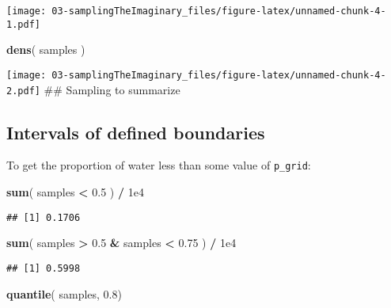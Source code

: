 \documentclass[
]{book}
\newenvironment{Shaded}{\begin{snugshade}}{\end{snugshade}}
\newcommand{\FloatTok}[1]{\textcolor[rgb]{0.00,0.00,0.81}{#1}}
\newcommand{\KeywordTok}[1]{\textcolor[rgb]{0.13,0.29,0.53}{\textbf{#1}}}
\newcommand{\NormalTok}[1]{#1}
\newcommand{\OperatorTok}[1]{\textcolor[rgb]{0.81,0.36,0.00}{\textbf{#1}}}
\newcommand{\StringTok}[1]{\textcolor[rgb]{0.31,0.60,0.02}{#1}}
\begin{document}
\texttt{[image: 03-samplingTheImaginary\_files/figure-latex/unnamed-chunk-4-1.pdf]}

\begin{Shaded}
\begin{Highlighting}[]
\KeywordTok{dens}\NormalTok{( samples )}
\end{Highlighting}
\end{Shaded}

\texttt{[image: 03-samplingTheImaginary\_files/figure-latex/unnamed-chunk-4-2.pdf]}
\#\# Sampling to summarize

\hypertarget{intervals-of-defined-boundaries}{%
\subsection{Intervals of defined boundaries}\label{intervals-of-defined-boundaries}}

To get the proportion of water less than some value of \texttt{p\_grid}:

\begin{Shaded}
\begin{Highlighting}[]
\KeywordTok{sum}\NormalTok{( samples }\OperatorTok{<}\StringTok{ }\FloatTok{0.5}\NormalTok{ ) }\OperatorTok{/}\StringTok{ }\FloatTok{1e4}
\end{Highlighting}
\end{Shaded}

\begin{verbatim}
## [1] 0.1706
\end{verbatim}

\begin{Shaded}
\begin{Highlighting}[]
\KeywordTok{sum}\NormalTok{( samples }\OperatorTok{>}\StringTok{ }\FloatTok{0.5} \OperatorTok{&}\StringTok{ }\NormalTok{samples }\OperatorTok{<}\StringTok{ }\FloatTok{0.75}\NormalTok{ ) }\OperatorTok{/}\StringTok{ }\FloatTok{1e4}
\end{Highlighting}
\end{Shaded}

\begin{verbatim}
## [1] 0.5998
\end{verbatim}

\begin{Shaded}
\begin{Highlighting}[]
\KeywordTok{quantile}\NormalTok{( samples, }\FloatTok{0.8}\NormalTok{)}
\end{Highlighting}
\end{Shaded}
\end{document}
